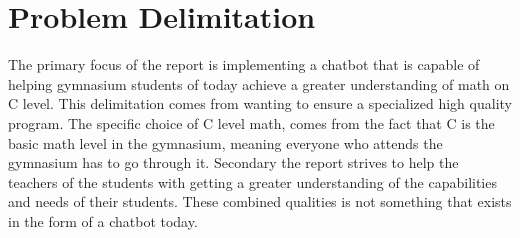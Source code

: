 \chapter{Problem Delimitation}\label{ch:problem_delimitation}

The primary focus of the report is implementing a chatbot that is capable of helping gymnasium students of today achieve a greater understanding of math on C level. This delimitation comes from wanting to ensure a specialized high quality program. The specific choice of C level math, comes from the fact that C is the basic math level in the gymnasium, meaning everyone who attends the gymnasium has to go through it. Secondary the report strives to help the teachers of the students with getting a greater understanding of the capabilities and needs of their students. These combined qualities is not something that exists in the form of a chatbot today. 


